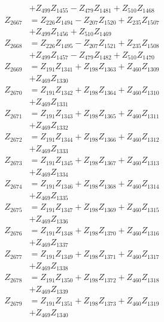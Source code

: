 \begin{multicols}{2}
\begin{align}
&+ Z_{499}Z_{1455} - Z_{479}Z_{1481} + Z_{510}Z_{1468} \nonumber \\
Z_{2667} &= Z_{226}Z_{1494} - Z_{207}Z_{1520} + Z_{235}Z_{1507}  \nonumber \\
&+ Z_{499}Z_{1456} + Z_{510}Z_{1469} \nonumber \\
Z_{2668} &= Z_{226}Z_{1495} - Z_{207}Z_{1521} + Z_{235}Z_{1508}  \nonumber \\
&+ Z_{499}Z_{1457} - Z_{479}Z_{1482} + Z_{510}Z_{1470} \nonumber \\
Z_{2669} &= Z_{191}Z_{1341} + Z_{198}Z_{1363} + Z_{460}Z_{1309}  \nonumber \\
&+ Z_{469}Z_{1330} \nonumber \\
Z_{2670} &= Z_{191}Z_{1342} + Z_{198}Z_{1364} + Z_{460}Z_{1310}  \nonumber \\
&+ Z_{469}Z_{1331} \nonumber \\
Z_{2671} &= Z_{191}Z_{1343} + Z_{198}Z_{1365} + Z_{460}Z_{1311}  \nonumber \\
&+ Z_{469}Z_{1332} \nonumber \\
Z_{2672} &= Z_{191}Z_{1344} + Z_{198}Z_{1366} + Z_{460}Z_{1312}  \nonumber \\
&+ Z_{469}Z_{1333} \nonumber \\
Z_{2673} &= Z_{191}Z_{1345} + Z_{198}Z_{1367} + Z_{460}Z_{1313}  \nonumber \\
&+ Z_{469}Z_{1334} \nonumber \\
Z_{2674} &= Z_{191}Z_{1346} + Z_{198}Z_{1368} + Z_{460}Z_{1314}  \nonumber \\
&+ Z_{469}Z_{1335} \nonumber \\
Z_{2675} &= Z_{191}Z_{1347} + Z_{198}Z_{1369} + Z_{460}Z_{1315}  \nonumber \\
&+ Z_{469}Z_{1336} \nonumber \\
Z_{2676} &= Z_{191}Z_{1348} + Z_{198}Z_{1370} + Z_{460}Z_{1316}  \nonumber \\
&+ Z_{469}Z_{1337} \nonumber \\
Z_{2677} &= Z_{191}Z_{1349} + Z_{198}Z_{1371} + Z_{460}Z_{1317}  \nonumber \\
&+ Z_{469}Z_{1338} \nonumber \\
Z_{2678} &= Z_{191}Z_{1350} + Z_{198}Z_{1372} + Z_{460}Z_{1318}  \nonumber \\
&+ Z_{469}Z_{1339} \nonumber \\
Z_{2679} &= Z_{191}Z_{1351} + Z_{198}Z_{1373} + Z_{460}Z_{1319}  \nonumber \\
&+ Z_{469}Z_{1340} \nonumber \\

\end{align}
\end{multicols}
